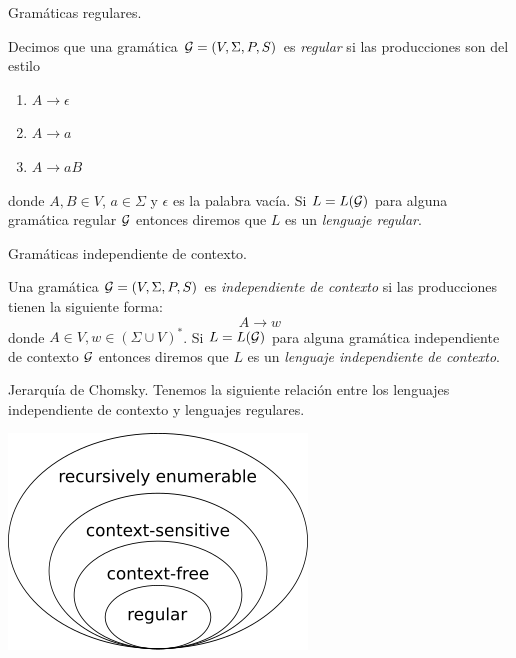 \documentclass[aspectratio=169, 11pt]{beamer}
\begin{document}
	\begin{frame}{Gramáticas regulares.}
		\begin{deff}
			Decimos que una gramática ${\cal G} = (V, \Sigma, P, S)$ es \emph{regular} si las producciones son del estilo
	\begin{enumerate}
		\item $A \to \epsilon$
		\item $A \to a$
		\item $A \to a B$
	\end{enumerate}
	donde $A, B \in V$, $a \in \Sigma$ y $\epsilon$ es la palabra vacía. 
	Si $L=L({\cal G})$ para alguna gramática regular $\cal G$ entonces diremos que $L$ es un \emph{lenguaje regular}.
		\end{deff}
	\end{frame}

	\begin{frame}{Gramáticas independiente de contexto.}
		\begin{deff}
			Una gramática ${\cal G} = (V, \Sigma, P, S) $ es \emph{independiente de contexto} si las producciones tienen la siguiente forma:
			\begin{equation*}
				A \to w
			\end{equation*}
			donde $A \in V, w \in (\Sigma \cup V)^*$.  
			Si $L=L({\cal G})$ para alguna gramática independiente de contexto $\cal G$ entonces diremos que $L$ es un \emph{lenguaje independiente de contexto}.

		\end{deff}
		
	\end{frame}

	\begin{frame}{Jerarquía de Chomsky.}
		Tenemos la siguiente relación entre los lenguajes independiente de contexto y lenguajes regulares.


			\centering
			\includegraphics[scale = 0.65]{Chomsky-hierarchy.png}
		
	\end{frame}
\end{document}
